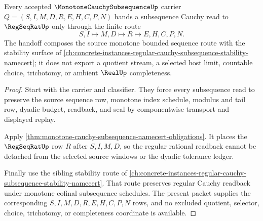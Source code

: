 \begin{theorem}
\label{thm:monotone-cauchy-subsequence-regseqrat-handoff}
Every accepted $\MonotoneCauchySubsequenceUp$ carrier $Q=(S,I,M,D,R,E,H,C,P,N)$ hands a subsequence Cauchy read to $\RegSeqRatUp$ only through the finite route
$$
S,I \longmapsto M,D \longmapsto R \longmapsto E,H,C,P,N .
$$
The handoff composes the source monotone bounded sequence route with the stability surface of \autoref{ch:concrete-instances-regular-cauchy-subsequence-stability-namecert}; it does not export a quotient stream, a selected host limit, countable choice, trichotomy, or ambient $\RealUp$ completeness.
\end{theorem}
\begin{proof}
Start with the carrier and classifier. They force every subsequence read to preserve the source sequence row, monotone index schedule, modulus and tail row, dyadic budget, readback, and seal by componentwise transport and displayed replay.

Apply \autoref{thm:monotone-cauchy-subsequence-namecert-obligations}. It places the $\RegSeqRatUp$ row $R$ after $S,I,M,D$, so the regular rational readback cannot be detached from the selected source windows or the dyadic tolerance ledger.

Finally use the sibling stability route of \autoref{ch:concrete-instances-regular-cauchy-subsequence-stability-namecert}. That route preserves regular Cauchy readback under monotone cofinal subsequence schedules. The present packet supplies the corresponding $S,I,M,D,R,E,H,C,P,N$ rows, and no excluded quotient, selector, choice, trichotomy, or completeness coordinate is available.
\end{proof}



